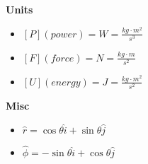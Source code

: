 \documentclass[8pt]{article}
\begin{document}
\textbf{Units}
\begin{itemize}
    \item $[P] (power) = W = \frac{kg \cdot m^2}{s^3}$
    \item $[F] (force) = N = \frac{kg \cdot m}{s^2}$
    \item $[U] (energy) = J = \frac{kg \cdot m^2}{s^2}$
\end{itemize}
\textbf{Misc}
\begin{itemize}
    \item $\hat{r} = \cos{\theta} \hat{i} + \sin{\theta} \hat{j}$
    \item $\hat{\phi} = -\sin{\theta} \hat{i} + \cos{\theta} \hat{j}$
\end{itemize}
\end{document}

